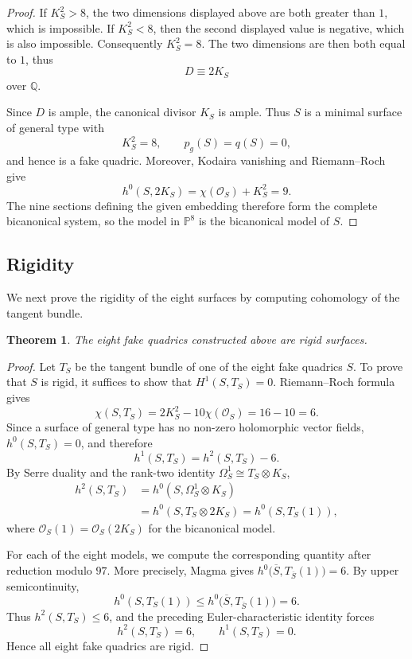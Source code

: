 \documentclass[11pt,a4paper]{article}
\newtheorem{theorem}{Theorem}[section]
\begin{document}
\begin{proof}
If $K_S^2>8$, the two dimensions displayed above are both greater than
$1$, which is impossible.  If $K_S^2<8$, then the second displayed value is negative, which is also impossible.
Consequently
\(
        K_S^2=8
\).
The two dimensions are then both equal to $1$, thus
\[
        D\equiv2K_S
\]
over $\mathbb Q$.

Since $D$ is ample, the canonical divisor $K_S$ is ample.  Thus $S$ is a
minimal surface of general type with
\[
        K_S^2=8,
        \qquad
        p_g(S)=q(S)=0,
\]
and hence is a fake quadric.  Moreover, Kodaira vanishing and
Riemann--Roch give
\[
        h^0(S,2K_S)=\chi(\mathcal O_S)+K_S^2=9.
\]
The nine sections defining the given embedding therefore form the complete
bicanonical system, so the model in $\mathbb P^8$ is the bicanonical model of
$S$.
\end{proof}





\subsection{Rigidity}
\label{subsec:rigidity}

We next prove the rigidity of the eight surfaces by computing cohomology of the tangent bundle.

\begin{theorem}
The eight fake quadrics constructed above are rigid surfaces.
\end{theorem}

\begin{proof}
Let $T_S$ be the tangent bundle of one of the eight fake quadrics $S$.  To prove that \(S\) is rigid,
it suffices to show that
\(
        H^1(S,T_S)=0.
\)
Riemann--Roch formula gives
\[
 \chi(S,T_S)=2K_S^2-10\chi(\mathcal O_S)=16-10=6.
\]
Since a surface of general type has no non-zero holomorphic vector fields,
\(h^0(S,T_S)=0\), and therefore
\[
        h^1(S,T_S)=h^2(S,T_S)-6.
\]
By Serre duality and the rank-two identity
\(\Omega_S^1\cong T_S\otimes K_S\),
\[
\begin{aligned}
 h^2(S,T_S)
   &=h^0(S,\Omega_S^1\otimes K_S)\\
   &=h^0(S,T_S\otimes2K_S)
    =h^0(S,T_S(1)),
\end{aligned}
\]
where \(\mathcal O_S(1)=\mathcal O_S(2K_S)\) for the bicanonical model.


For each of the eight models, we compute the corresponding quantity
after reduction modulo $97$.  More precisely, Magma gives
\(h^0\bigl(\overline S,T_{\overline S}(1)\bigr)=6\).
By upper semicontinuity,
\[
        h^0(S,T_S(1))
        \leq
        h^0\bigl(\overline S,T_{\overline S}(1)\bigr)
        =6.
\]
Thus $h^2(S,T_S)\leq6$, and the preceding Euler-characteristic identity
forces
\[
        h^2(S,T_S)=6,
        \qquad
        h^1(S,T_S)=0.
\]
Hence all eight fake quadrics are rigid.
\end{proof}
\end{document}
